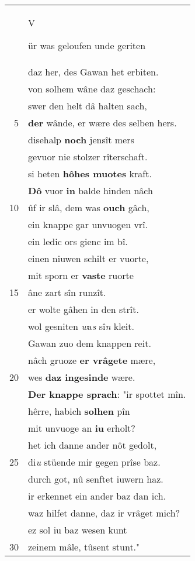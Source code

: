 \documentclass[8pt,a4paper,notitlepage]{article}
\begin{document}
\begin{table}[ht]
\begin{minipage}[t]{0.5\linewidth}
\begin{center}
\end{center}
\begin{tabular}{rl}
 & \begin{large}V\end{large}ür was geloufen unde geriten\\ 
 & daz her, des Gawan het erbiten.\\ 
 & von solhem wâne daz geschach:\\ 
 & swer den helt dâ halten sach,\\ 
5 & \textbf{der} wânde, er wære des selben hers.\\ 
 & disehalp \textbf{noch} jensît mers\\ 
 & gevuor nie stolzer rîterschaft.\\ 
 & si heten \textbf{hôhes muotes} kraft.\\ 
 & \textbf{Dô} vuor \textbf{in} balde hinden nâch\\ 
10 & ûf ir slâ, dem was \textbf{ouch} gâch,\\ 
 & ein knappe gar unvuogen vrî.\\ 
 & ein ledic ors gienc im bî.\\ 
 & einen niuwen schilt er vuorte,\\ 
 & mit sporn er \textbf{vaste} ruorte\\ 
15 & âne zart sîn runzît.\\ 
 & er wolte gâhen in den strît.\\ 
 & wol gesniten \textit{w}a\textit{s} sî\textit{n} kleit.\\ 
 & Gawan zuo dem knappen reit.\\ 
 & nâch gruoze \textbf{er vrâgete} mære,\\ 
20 & wes \textbf{daz ingesinde} wære.\\ 
 & \textbf{Der knappe sprach}: "ir spottet mîn.\\ 
 & hêrre, habich \textbf{solhen} pîn\\ 
 & mit unvuoge an \textbf{iu} erholt?\\ 
 & het ich danne ander nôt gedolt,\\ 
25 & di\textit{u} stüende mir gegen prîse baz.\\ 
 & durch got, nû senftet iuwern haz.\\ 
 & ir erkennet ein ander baz dan ich.\\ 
 & waz hilfet danne, daz ir vrâget mich?\\ 
 & ez sol iu baz wesen kunt\\ 
30 & zeinem mâle, tûsent stunt."\\ 

\end{tabular}
\end{minipage}
\end{table}
\end{document}
